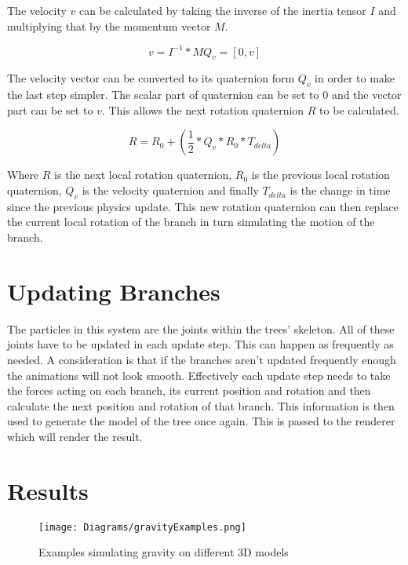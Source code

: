 \noindent
The velocity $v$ can be calculated by taking the inverse of the inertia tensor $I$ and multiplying that by the momentum vector $M$.

\begin{equation}
v = I^{-1} * M
Q_v = [0, v]
\end{equation}

\noindent
The velocity vector can be converted to its quaternion form $Q_v$ in order to make the last step simpler. The scalar part of quaternion can be set to 0 and the vector part can be set to $v$. This allows the next rotation quaternion $R$ to be calculated. 

\begin{equation}
R = R_0 + (\frac{1}{2} * Q_v * R_0 * T_{delta})
\end{equation}

\noindent
Where $R$ is the next local rotation quaternion, $R_0$ is the previous local rotation quaternion, $Q_v$ is the velocity quaternion and finally $T_{delta}$ is the change in time since the previous physics update. This new rotation quaternion can then replace the current local rotation of the branch in turn simulating the motion of the branch.

\section{Updating Branches}

The particles in this system are the joints within the trees' skeleton. All of these joints have to be updated in each update step. This can happen as frequently as needed. A consideration is that if the branches aren't updated frequently enough the animations will not look smooth. Effectively each update step needs to take the forces acting on each branch, its current position and rotation and then calculate the next position and rotation of that branch. This information is then used to generate the model of the tree once again. This is passed to the renderer which will render the result. 

\section{Results}

\begin{figure}[htbp]
	{\centering
		\vspace{7px}
		\texttt{[image: Diagrams/gravityExamples.png]}
		\label{3DAxisFigure} \label{Gravity applied to generated models}
		\caption{Examples simulating gravity on different 3D models}
	}
\end{figure}
\FloatBarrier

